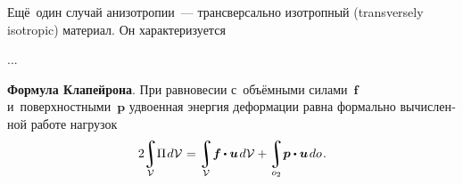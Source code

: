 \begin{otherlanguage}{russian}
Ещё~один случай анизотропии~--- трансверсально изотропный (transversely isotropic) материал. Он характеризуется

...





\noindent\leavevmode{\indent}%
\textbf{Формула Клапейрона}. При равновесии с~объёмными силами~$\bm{f}$ и~поверхностными~$\bm{p}$ удвоенная энергия деформации равна формально вычисленной работе нагрузок
\vspace{0.1em}\begin{equation}\label{clapeyron:elasticitytheorem}
2 \hspace{-0.2em}
\integral\displaylimits_{\mathcal{V}} \hspace{-0.5ex} \Pi \hspace{0.2ex} d\mathcal{V} \hspace{.12ex} =
\integral\displaylimits_{\mathcal{V}} \hspace{-0.4ex} \bm{f} \hspace{-0.1ex} \dotp \bm{u} \hspace{0.25ex} d\mathcal{V} +
\integral\displaylimits_{o_2} \hspace{-0.4ex} \bm{p} \dotp \bm{u} \hspace{0.25ex} do \hspace{0.2ex} .
\end{equation}


\end{otherlanguage}
